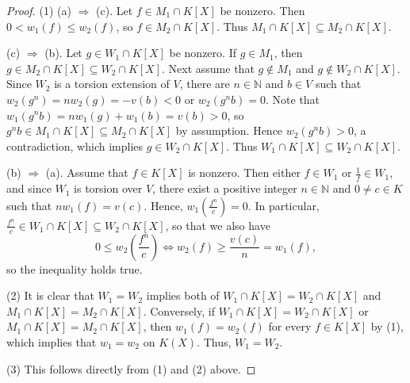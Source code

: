\documentclass[10pt,a4paper]{amsart}
\newcommand{\N}{\mathbb{N}}
\begin{document}
\begin{proof}
(1) (a) $\Rightarrow$ (c). Let $f\in M_1\cap K[X]$ be nonzero. Then $0 < w_1(f)\leq w_2(f)$, so $f\in M_2\cap K[X]$.
Thus $M_1\cap K[X]\subseteq M_2\cap K[X].$ 

(c) $\Rightarrow$ (b). Let $g\in W_1\cap K[X]$ be nonzero. If $g \in M_1$, then $g \in M_2 \cap K[X] \subseteq W_2 \cap K[X]$.
Next assume that $g \not\in M_1$ and $g \not\in W_2 \cap K[X]$. Since $W_2$ is a torsion extension of $V$,
there are $n \in \mathbb{N}$ and $b \in V$ such that $w_2(g^n) = nw_2(g) = -v(b) <0$ or $w_2(g^nb) =0$.
Note that $w_1(g^nb) = nw_1(g)+w_1(b) = v(b) >0$, so $g^nb \in M_1 \cap K[X] \subseteq M_2 \cap K[X]$
by assumption. Hence $w_2(g^nb) > 0$, a contradiction, which implies $g \in W_2 \cap K[X]$.
Thus $W_1\cap K[X]\subseteq W_2\cap K[X].$

(b) $\Rightarrow$ (a). Assume that $f\in K[X]$ is nonzero. Then either $f \in W_1$ or $\frac{1}{f} \in W_1$, and since
$W_1$ is torsion over $V$, there exist a positive integer  $n\in\N$ and $0 \neq c\in K$ such that $nw_1(f)=v(c)$. 
Hence, $w_1(\frac{f^n}{c}) = 0$. 
In particular, $\frac{f^n}{c}\in W_1\cap K[X]\subseteq W_2\cap K[X]$, so that we also have
$$0\leq w_2\left(\frac{f^n}{c}\right)\Leftrightarrow w_2(f)\geq\frac{v(c)}{n}=w_1(f),$$
so the inequality holds true. 

(2) It is clear that $W_1=W_2$ implies both of $W_1\cap K[X]=W_2\cap K[X]$ 
and $M_1\cap K[X]= M_2\cap K[X]$. Conversely, if $W_1\cap K[X]=W_2\cap K[X]$ or $M_1\cap K[X]= M_2\cap K[X]$,  
then $w_1(f)=w_2(f)$ for every $f\in K[X]$ by (1), which implies that $w_1=w_2$ on $K(X)$. Thus, $W_1=W_2$.

(3) This follows directly from (1) and (2) above.
\end{proof}
\end{document}
